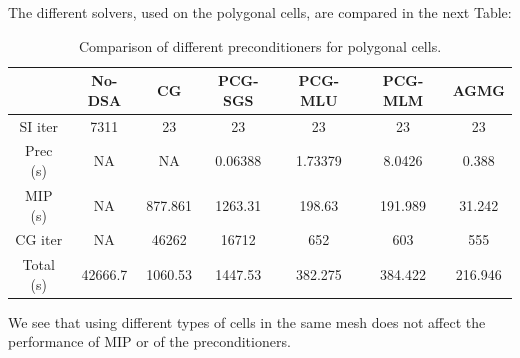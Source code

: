 The different solvers, used on the polygonal cells, are compared in the next Table:
\begin{table}[H]
\begin{center}
\caption{Comparison of different preconditioners for polygonal cells.}
\begin{tabular}{|c|c|c|c|c|c|c|}
\hline
& No-DSA & CG & PCG-SGS & PCG-MLU & PCG-MLM & AGMG\\
\hline
SI iter   & 7311    & 23      & 23      & 23      & 23      & 23      \\
Prec (s)  & NA      & NA      & 0.06388 & 1.73379 & 8.0426  & 0.388   \\
MIP (s)   & NA      & 877.861 & 1263.31 & 198.63  & 191.989 & 31.242  \\
CG iter   & NA      & 46262   & 16712   & 652     & 603     & 555     \\
Total (s) & 42666.7 & 1060.53 & 1447.53 & 382.275 & 384.422 & 216.946 \\
\hline
\end{tabular}
\end{center}
\end{table}
We see that using different types of cells in the same mesh does not affect
the performance of MIP or of the preconditioners. 

